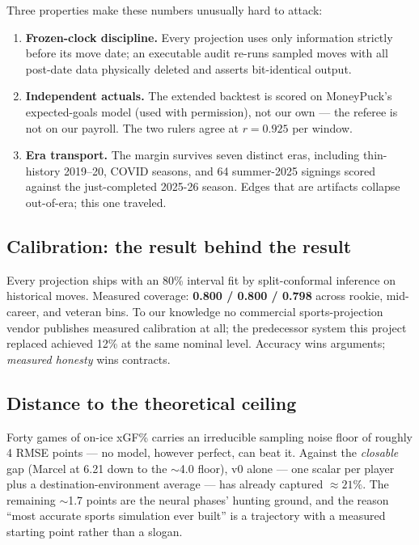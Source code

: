 \documentclass[11pt]{article}
\begin{document}
\noindent Three properties make these numbers unusually hard to attack:
\begin{enumerate}[nosep]
\item \textbf{Frozen-clock discipline.} Every projection uses only information strictly
before its move date; an executable audit re-runs sampled moves with all post-date data
physically deleted and asserts bit-identical output.
\item \textbf{Independent actuals.} The extended backtest is scored on MoneyPuck's
expected-goals model (used with permission), not our own --- the referee is not on our
payroll. The two rulers agree at $r = 0.925$ per window.
\item \textbf{Era transport.} The margin survives seven distinct eras, including thin-%
history 2019--20, COVID seasons, and 64 summer-2025 signings scored against the
just-completed 2025-26 season. Edges that are artifacts collapse out-of-era; this one
traveled.
\end{enumerate}

\subsection{Calibration: the result behind the result}

Every projection ships with an 80\% interval fit by split-conformal inference on
historical moves. Measured coverage: \textbf{0.800 / 0.800 / 0.798} across rookie,
mid-career, and veteran bins. To our knowledge no commercial sports-projection vendor
publishes measured calibration at all; the predecessor system this project replaced
achieved 12\% at the same nominal level. Accuracy wins arguments; \emph{measured honesty}
wins contracts.

\subsection{Distance to the theoretical ceiling}

Forty games of on-ice xGF\% carries an irreducible sampling noise floor of roughly 4
RMSE points --- no model, however perfect, can beat it. Against the \emph{closable} gap
(Marcel at 6.21 down to the $\sim$4.0 floor), v0 alone --- one scalar per player plus a
destination-environment average --- has already captured $\approx 21\%$. The remaining
$\sim$1.7 points are the neural phases' hunting ground, and the reason ``most accurate
sports simulation ever built'' is a trajectory with a measured starting point rather
than a slogan.
\end{document}
